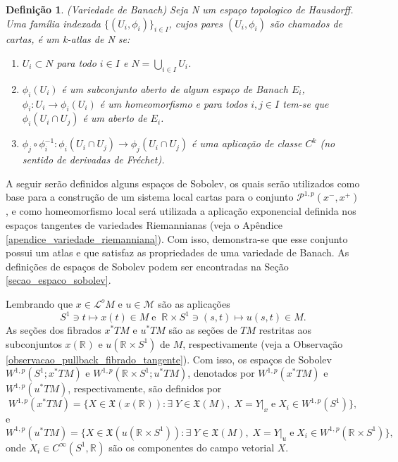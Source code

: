 \documentclass[12pt]{book}
\newtheorem{definicao}[teorema]{Definição}
\newcommand{\caminhosexponenciaisconectantes}[2]{\mathcal{P}^{1,p}(#1, #2)}
\newcommand{\caminhosexponenciaisconectantespadrao}{\caminhosexponenciaisconectantes{x^{-}}{x^{+}}}
\newcommand{\campossuaves}[1]{\mathfrak{X}(#1)}
\newcommand{\circulo}{S^{1}}
\newcommand{\energiafinitaM}{\mathcal{M}}
\newcommand{\espacosobolev}[1]{W^{1,p}(#1)}
\newcommand{\espacosobolevcontradominio}[2]{W^{1,p}(#1;#2)}
\newcommand{\funcoessuaves}[1]{C^{\infty}(#1, \real{})}
\newcommand{\pullbackfibradotangente}[2]{#1^{*}T#2}
\newcommand{\pullbackfibradotangenteM}[1]{\pullbackfibradotangente{#1}{M}}
\newcommand{\retacartesianocirculo}{\real{} \times \circulo}
\newcommand{\real}[1]{\mathbb{R}^{#1}}
\newcommand{\reta}{\real{}}
\newcommand{\lacocontrateis}{\mathcal{L}^{o}M}
\begin{document}
	\begin{definicao}
		(Variedade de Banach) Seja N um espaço topologico de Hausdorff. Uma família indexada $\{(U_{i}, \phi_{i})\}_{i \in I}$, cujos pares $(U_{i}, \phi_{i})$ são chamados de cartas, é um k-atlas de N se:
		\begin{enumerate}
			\item $U_{i}\subset N$ para todo $i\in I$ e $N=\bigcup_{i\in I} U_{i}$.
			
			\item $\phi_{i}(U_{i})$ é um subconjunto aberto de algum espaço de Banach $E_{i}$, $\phi_{i}:U_{i} \to \phi_{i}(U_{i})$ é um homeomorfismo e para todos $i,j\in I$ tem-se que $\phi_{i}(U_{i}\cap U_{j})$ é um aberto de $E_{i}$.
			
			\item $\phi_{j}\circ \phi_{i}^{-1}: \phi_{i}(U_{i}\cap U_{j}) \to \phi_{j}(U_{i}\cap U_{j}) $ é uma aplicação de classe $C^{k}$ (no sentido de derivadas de Fréchet).
		\end{enumerate}
	\end{definicao}
	
	A seguir serão definidos alguns espaços de Sobolev, os quais serão utilizados como base para a construção de um sistema local cartas para o conjunto $\caminhosexponenciaisconectantespadrao$, e como homeomorfismo local será utilizada a aplicação exponencial definida nos espaços tangentes de variedades Riemannianas (veja o Apêndice \ref{apendice_variedade_riemanniana}). Com isso, demonstra-se que esse conjunto possui um atlas e que satisfaz as propriedades de uma variedade de Banach. As definições de espaços de Sobolev podem ser encontradas na Seção \ref{secao_espaco_sobolev}.
	
	Lembrando que $x\in\lacocontrateis$ e $u \in \energiafinitaM$ são as aplicações 
	$$
	\circulo \ni t \mapsto x(t) \in M\; \text{e}\;\;\retacartesianocirculo \ni (s,t)\mapsto u(s,t) \in M.
	$$ 
	As seções dos fibrados $\pullbackfibradotangenteM{x}$ e $\pullbackfibradotangenteM{u}$ são as seções de $TM$ restritas aos subconjuntos $x(\reta )$ e  $u(\retacartesianocirculo )$ de $M$, respectivamente (veja a Observação \ref{observacao_pullback_fibrado_tangente}). Com isso, os espaços de Sobolev $\espacosobolevcontradominio{\circulo}{\pullbackfibradotangenteM{x}}$ e $\espacosobolevcontradominio{\retacartesianocirculo}{\pullbackfibradotangenteM{u}}$, denotados por $\espacosobolev{\pullbackfibradotangenteM{x}}$ e $\espacosobolev{\pullbackfibradotangenteM{u}}$, respectivamente, são definidos por
	$$
	\espacosobolev{\pullbackfibradotangenteM{x}}=
	\{X\in \campossuaves{x(\reta)}: \exists\; Y\in \campossuaves{M}, \; X=Y|_{x}\;\text{e}\;  X_{i}\in \espacosobolev{\circulo} \},
	$$
	e
	$$
	\espacosobolev{\pullbackfibradotangenteM{u}}=
	\{X\in \campossuaves{u(\retacartesianocirculo)}: \exists\; Y\in \campossuaves{M}, \; X=Y|_{u}\;\text{e}\;  X_{i}\in \espacosobolev{\retacartesianocirculo} \},
	$$
	onde $X_{i} \in \funcoessuaves{\circulo}$ são os componentes do campo vetorial $X$. 
	
\end{document}
